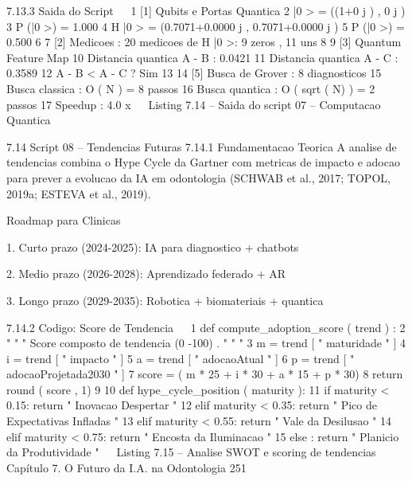      7.13.3      Saida do Script
                                                                                        
 1       [1] Qubits e Portas Quantica
 2       |0 > = ((1+0 j ) , 0 j )
 3       P (|0 >) = 1.000
 4       H |0 > = (0.7071+0.0000 j , 0.7071+0.0000 j )
 5       P (|0 >) = 0.500
 6
 7       [2] Medicoes : 20 medicoes de H |0 >: 9 zeros , 11 uns
 8
 9       [3] Quantum Feature Map
10       Distancia quantica A - B : 0.0421
11       Distancia quantica A - C : 0.3589
12       A - B < A - C ? Sim
13
14       [5] Busca de Grover : 8 diagnosticos
15       Busca classica : O ( N ) = 8 passos
16       Busca quantica : O ( sqrt ( N) ) = 2 passos
17       Speedup : 4.0 x
                                                                                        
                      Listing 7.14 – Saida do script 07 – Computacao Quantica



     7.14       Script 08 – Tendencias Futuras
     7.14.1      Fundamentacao Teorica
     A analise de tendencias combina o Hype Cycle da Gartner com metricas de impacto e
     adocao para prever a evolucao da IA em odontologia (SCHWAB et al., 2017; TOPOL,
     2019a; ESTEVA et al., 2019).

         Roadmap para Clinicas

            1. Curto prazo (2024-2025): IA para diagnostico + chatbots

            2. Medio prazo (2026-2028): Aprendizado federado + AR

            3. Longo prazo (2029-2035): Robotica + biomateriais + quantica


     7.14.2      Codigo: Score de Tendencia
                                                                                        
 1 def compute_adoption_score ( trend ) :
 2     " " " Score composto de tendencia (0 -100) . " " "
 3     m = trend [ " maturidade " ]
 4     i = trend [ " impacto " ]
 5     a = trend [ " adocaoAtual " ]
 6     p = trend [ " adocaoProjetada2030 " ]
 7     score = ( m * 25 + i * 30 + a * 15 + p * 30)
 8     return round ( score , 1)
 9
10 def hype_cycle_position ( maturity ):
11     if maturity < 0.15: return " Inovacao Despertar "
12     elif maturity < 0.35: return " Pico de Expectativas Infladas "
13     elif maturity < 0.55: return " Vale da Desilusao "
14     elif maturity < 0.75: return " Encosta da Iluminacao "
15     else : return " Planicio da Produtividade "
                                                                                        
                        Listing 7.15 – Analise SWOT e scoring de tendencias
    Capítulo 7. O Futuro da I.A. na Odontologia                                        251


